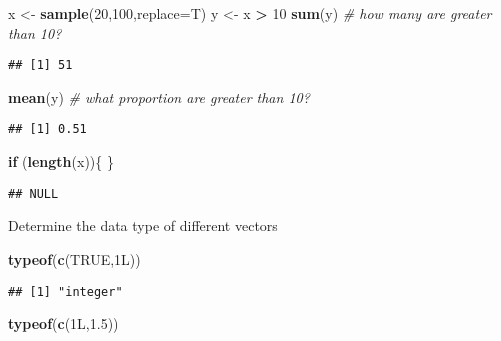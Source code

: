 \documentclass[
]{article}
\newenvironment{Shaded}{\begin{snugshade}}{\end{snugshade}}
\newcommand{\AttributeTok}[1]{\textcolor[rgb]{0.13,0.29,0.53}{#1}}
\newcommand{\CommentTok}[1]{\textcolor[rgb]{0.56,0.35,0.01}{\textit{#1}}}
\newcommand{\ConstantTok}[1]{\textcolor[rgb]{0.56,0.35,0.01}{#1}}
\newcommand{\ControlFlowTok}[1]{\textcolor[rgb]{0.13,0.29,0.53}{\textbf{#1}}}
\newcommand{\DecValTok}[1]{\textcolor[rgb]{0.00,0.00,0.81}{#1}}
\newcommand{\FloatTok}[1]{\textcolor[rgb]{0.00,0.00,0.81}{#1}}
\newcommand{\FunctionTok}[1]{\textcolor[rgb]{0.13,0.29,0.53}{\textbf{#1}}}
\newcommand{\NormalTok}[1]{#1}
\newcommand{\OtherTok}[1]{\textcolor[rgb]{0.56,0.35,0.01}{#1}}
\newcommand{\SpecialCharTok}[1]{\textcolor[rgb]{0.81,0.36,0.00}{\textbf{#1}}}
\begin{document}
\begin{Shaded}
\begin{Highlighting}[]
\NormalTok{x }\OtherTok{\textless{}{-}} \FunctionTok{sample}\NormalTok{(}\DecValTok{20}\NormalTok{,}\DecValTok{100}\NormalTok{,}\AttributeTok{replace=}\NormalTok{T)}
\NormalTok{y }\OtherTok{\textless{}{-}}\NormalTok{ x }\SpecialCharTok{\textgreater{}} \DecValTok{10}
\FunctionTok{sum}\NormalTok{(y) }\CommentTok{\# how many are greater than 10?}
\end{Highlighting}
\end{Shaded}

\begin{verbatim}
## [1] 51
\end{verbatim}

\begin{Shaded}
\begin{Highlighting}[]
\FunctionTok{mean}\NormalTok{(y) }\CommentTok{\# what proportion are greater than 10?}
\end{Highlighting}
\end{Shaded}

\begin{verbatim}
## [1] 0.51
\end{verbatim}

\begin{Shaded}
\begin{Highlighting}[]
\ControlFlowTok{if}\NormalTok{ (}\FunctionTok{length}\NormalTok{(x))\{}
\NormalTok{\}}
\end{Highlighting}
\end{Shaded}

\begin{verbatim}
## NULL
\end{verbatim}

Determine the data type of different vectors

\begin{Shaded}
\begin{Highlighting}[]
\FunctionTok{typeof}\NormalTok{(}\FunctionTok{c}\NormalTok{(}\ConstantTok{TRUE}\NormalTok{,1L))}
\end{Highlighting}
\end{Shaded}

\begin{verbatim}
## [1] "integer"
\end{verbatim}

\begin{Shaded}
\begin{Highlighting}[]
\FunctionTok{typeof}\NormalTok{(}\FunctionTok{c}\NormalTok{(1L,}\FloatTok{1.5}\NormalTok{))}
\end{Highlighting}
\end{Shaded}
\end{document}
